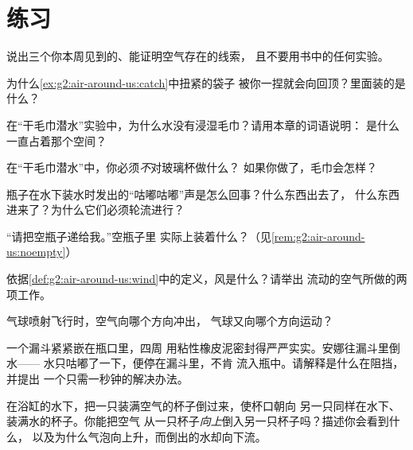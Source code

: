 \section{练习}

\begin{exercise}[$\star$]\label{exo:g2:air-around-us:1}
说出三个你本周见到的、能证明空气存在的线索，
且不要用书中的任何实验。
\end{exercise}

\begin{exercise}[$\star$]\label{exo:g2:air-around-us:2}
为什么\cref{ex:g2:air-around-us:catch}中扭紧的袋子
被你一捏就会向回顶？里面装的是什么？
\end{exercise}

\begin{exercise}[$\star$]\label{exo:g2:air-around-us:3}
在“干毛巾潜水”实验中，为什么水没有浸湿毛巾？请用本章的词语说明：
是什么一直占着那个空间？
\end{exercise}

\begin{exercise}[$\star$]\label{exo:g2:air-around-us:4}
在“干毛巾潜水”中，你必须\emph{不}对玻璃杯做什么？
如果你做了，毛巾会怎样？
\end{exercise}

\begin{exercise}[$\star$]\label{exo:g2:air-around-us:5}
瓶子在水下装水时发出的“咕嘟咕嘟”声是怎么回事？什么东西出去了，
什么东西进来了？为什么它们必须轮流进行？
\end{exercise}

\begin{exercise}[$\star$]\label{exo:g2:air-around-us:6}
“请把空瓶子递给我。”空瓶子里
实际上装着什么？（见\cref{rem:g2:air-around-us:noempty}）
\end{exercise}

\begin{exercise}[$\star$]\label{exo:g2:air-around-us:7}
依据\cref{def:g2:air-around-us:wind}中的定义，风是什么？请举出
流动的空气所做的两项工作。
\end{exercise}

\begin{exercise}[$\star$]\label{exo:g2:air-around-us:8}
气球喷射飞行时，空气向哪个方向冲出，
气球又向哪个方向运动？
\end{exercise}

\begin{exercise}[$\star\star$]\label{exo:g2:air-around-us:9}
一个漏斗紧紧嵌在瓶口里，四周
用粘性橡皮泥密封得严严实实。安娜往漏斗里倒水——
水只咕嘟了一下，便停在漏斗里，不肯
流入瓶中。请解释是什么在阻挡，并提出
一个只需一秒钟的解决办法。
\end{exercise}

\begin{exercise}[$\star\star$]\label{exo:g2:air-around-us:10}
在浴缸的水下，把一只装满空气的杯子倒过来，使杯口朝向
另一只同样在水下、装满水的杯子。你能把空气
从一只杯子\emph{向上}倒入另一只杯子吗？描述你会看到什么，
以及为什么气泡向上升，而倒出的水却向下流。
\end{exercise}
